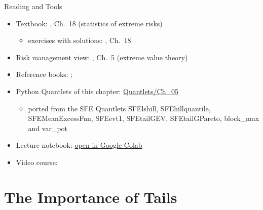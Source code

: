 \begin{frame}{Reading and Tools}
\itemsize{\small}
\begin{itemize}
    \item Textbook: , Ch.~18 (statistics of extreme risks)
    \begin{itemize}
        \item exercises with solutions: , Ch.~18
    \end{itemize}
    \item Risk management view: , Ch.~5 (extreme value theory)
    \item Reference books: ; 
    \item Python Quantlets of this chapter: \href{https://github.com/danpele/SFM/tree/main/Quantlets/Ch_05}{Quantlets/Ch\_05}
    \begin{itemize}
        \item ported from the SFE Quantlets SFElshill, SFEhillquantile, SFEMeanExcessFun, SFEevt1, SFEtailGEV, SFEtailGPareto, block\_max and var\_pot
    \end{itemize}
    \item Lecture notebook: \href{\colaburl{notebooks/EN/chapter5_lecture_notebook.ipynb}}{open in Google Colab}
    \item Video course: 
\end{itemize}
\end{frame}


\section{The Importance of Tails}

